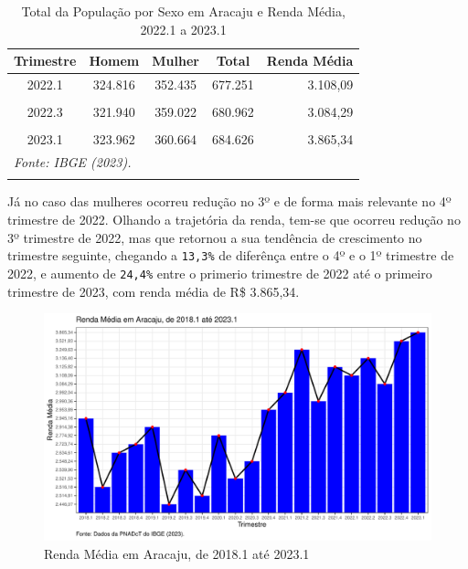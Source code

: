 \documentclass[
  12pt,
  a4paper,
]{article}
\begin{document}
\begin{longtable}[t]{ccccr}
\caption{\label{tab:tab1}\label{tab1}Total da População por Sexo em Aracaju e Renda Média, 
2022.1 a 2023.1}\\
\toprule
Trimestre & Homem & Mulher & Total & Renda Média\\
\midrule
2022.1 & 324.816 & 352.435 & 677.251 & 3.108,09\\
\cellcolor[HTML]{DCDCDC}{2022.2} & \cellcolor[HTML]{DCDCDC}{319.497} & \cellcolor[HTML]{DCDCDC}{359.615} & \cellcolor[HTML]{DCDCDC}{679.112} & \cellcolor[HTML]{DCDCDC}{3.136,40}\\
2022.3 & 321.940 & 359.022 & 680.962 & 3.084,29\\
\cellcolor[HTML]{DCDCDC}{2022.4} & \cellcolor[HTML]{DCDCDC}{325.904} & \cellcolor[HTML]{DCDCDC}{356.896} & \cellcolor[HTML]{DCDCDC}{682.800} & \cellcolor[HTML]{DCDCDC}{3.521,83}\\
2023.1 & 323.962 & 360.664 & 684.626 & 3.865,34\\
\bottomrule
\multicolumn{5}{l}{\rule{0pt}{1em}\textit{Fonte: IBGE (2023).}}\\
\multicolumn{5}{l}{\rule{0pt}{1em}}\\
\end{longtable}
\endgroup{}

Já no caso das mulheres ocorreu redução no 3º e de forma mais relevante
no 4º trimestre de 2022. Olhando a trajetória da renda, tem-se que
ocorreu redução no 3º trimestre de 2022, mas que retornou a sua
tendência de crescimento no trimestre seguinte, chegando a
\texttt{13,3\%} de diferênça entre o 4º e o 1º trimestre de 2022, e
aumento de \texttt{24,4\%} entre o primerio trimestre de 2022 até o
primeiro trimestre de 2023, com renda média de R\$ 3.865,34.

\FloatBarrier
\begin{figure}

{\centering \includegraphics[width=1\linewidth]{wilas_relatorio_files/figure-latex/fig1-1} 

}

\caption{Renda Média em Aracaju, de 2018.1 até 2023.1}\label{fig:fig1}
\end{figure}
\FloatBarrier
\end{document}
